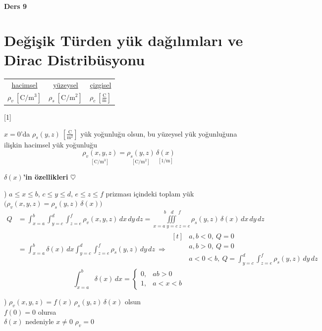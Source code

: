 \documentclass[11pt,a4paper]{article}
\begin{document}

\textbf{Ders 9}
\section{Değişik Türden yük dağılımları ve Dirac Distribüsyonu}

\begin{center}
\begin{tabular}{ccc}
\underline{hacimsel} & \underline{yüzeysel} & \underline{çizgisel}\\[2pt]
$\rho_v\ [\mathrm{C/m^3}]$ & $\rho_s\ [\mathrm{C/m^2}]$ & $\rho_c\ \left[\frac{\mathrm{C}}{\mathrm{m}}\right]$
\end{tabular}
\end{center}

[1]

$x=0$'da $\rho_s(y,z)\ \left[\frac{\mathrm{C}}{\mathrm{m}^2}\right]$ yük yoğunluğu olsun, bu yüzeysel yük yoğunluğuna ilişkin hacimsel yük yoğunluğu
\[
\underset{[\mathrm{C/m^3}]}{\rho_v(x,y,z)}=\underset{[\mathrm{C/m^2}]}{\rho_s(y,z)}\,\underset{[1/\mathrm{m}]}{\delta(x)}
\]

\noindent\textbf{$\delta(x)$'in özellikleri} $\heartsuit$

) $a\le x\le b$, $c\le y\le d$, $e\le z\le f$ prizması içindeki toplam yük $\bigl(\rho_v(x,y,z)=\rho_s(y,z)\,\delta(x)\bigr)$
\begin{align*}
Q&=\int_{x=a}^{b}\int_{y=c}^{d}\int_{z=e}^{f}\rho_v(x,y,z)\,dx\,dy\,dz
=\iiint\limits_{x=a\;y=c\;z=e}^{\;b\quad d\quad f}\rho_s(y,z)\,\delta(x)\,dx\,dy\,dz\\
&=\int_{x=a}^{b}\delta(x)\,dx\int_{y=c}^{d}\int_{z=e}^{f}\rho_s(y,z)\,dy\,dz\ \Rightarrow\
\begin{aligned}[t]
&a,b<0,\ Q=0\\
&a,b>0,\ Q=0\\
&a<0<b,\ Q=\int_{y=c}^{d}\int_{z=e}^{f}\rho_s(y,z)\,dy\,dz
\end{aligned}
\end{align*}
\[
\int_{x=a}^{b}\delta(x)\,dx=\begin{cases}0, & ab>0\\ 1, & a<x<b\end{cases}
\]

) $\rho_v(x,y,z)=f(x)\,\rho_s(y,z)\,\delta(x)$ olsun\\
$f(0)=0$ olursa\\
$\delta(x)$ nedeniyle $x\neq 0$ $\rho_v=0$
\end{document}
